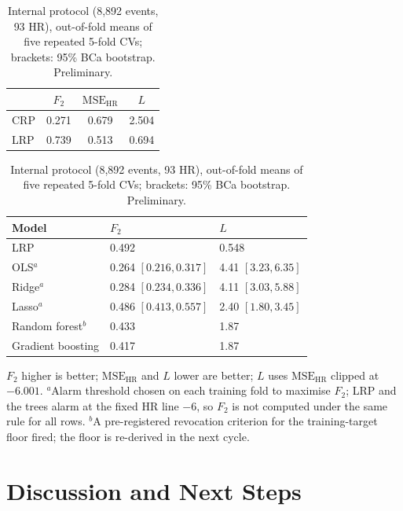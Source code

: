 \documentclass[clean]{bam-proposal}
\begin{document}
\begin{table}[htbp]
  \small
  \begin{minipage}[t]{0.37\linewidth}
    \centering
    \caption{Official test set (\(n=2167\), 150 HR), baselines as in the proposal.}
    \label{tab:official}
    \begin{tabular}{@{}lccc@{}}
      \toprule
      & \(F_2\) & \(\mathrm{MSE}_{\mathrm{HR}}\) & \(L\) \\
      \midrule
      CRP & 0.271 & 0.679 & 2.504 \\
      LRP & 0.739 & 0.513 & 0.694 \\
      \bottomrule
    \end{tabular}
  \end{minipage}\hfill
  \begin{minipage}[t]{0.60\linewidth}
    \centering
    \caption{Internal protocol (8{,}892 events, 93 HR), out-of-fold means of five repeated 5-fold CVs; brackets: 95\% BCa bootstrap. Preliminary.}
    \label{tab:internal}
    \begin{tabular}{@{}lll@{}}
      \toprule
      Model & \(F_2\) & \(L\) \\
      \midrule
      LRP & 0.492 & 0.548 \\
      OLS\(^{a}\) & 0.264 \([0.216, 0.317]\) & 4.41 \([3.23, 6.35]\) \\
      Ridge\(^{a}\) & 0.284 \([0.234, 0.336]\) & 4.11 \([3.03, 5.88]\) \\
      Lasso\(^{a}\) & 0.486 \([0.413, 0.557]\) & 2.40 \([1.80, 3.45]\) \\
      Random forest\(^{b}\) & 0.433 & 1.87 \\
      Gradient boosting & 0.417 & 1.87 \\
      \bottomrule
    \end{tabular}
  \end{minipage}

  \smallskip
  {\footnotesize \(F_2\) higher is better; \(\mathrm{MSE}_{\mathrm{HR}}\) and \(L\) lower are better; \(L\) uses \(\mathrm{MSE}_{\mathrm{HR}}\) clipped at \(-6.001\).
  \(^{a}\)Alarm threshold chosen on each training fold to maximise \(F_2\); LRP and the trees alarm at the fixed HR line \(-6\), so \(F_2\) is not computed under the same rule for all rows.
  \(^{b}\)A pre-registered revocation criterion for the training-target floor fired; the floor is re-derived in the next cycle.\par}
\end{table}

\section{Discussion and Next Steps}
\end{document}
